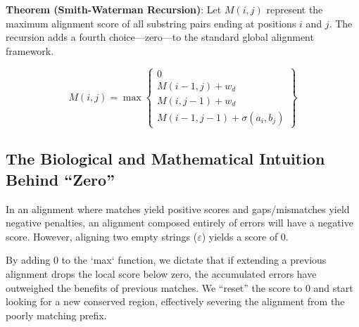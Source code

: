 \begin{important}
    \textbf{Theorem (Smith-Waterman Recursion)}:
    Let $M(i,j)$ represent the maximum alignment score of all substring pairs ending at positions $i$ and $j$. The recursion adds a fourth choice—zero—to the standard global alignment framework.
    
    \begin{equation}
    M(i, j) = \max \left\{ 
        \begin{array}{l} 
        0 \\ 
        M(i-1, j) + w_d \\ 
        M(i, j-1) + w_d \\ 
        M(i-1, j-1) + \sigma(a_i, b_j) 
        \end{array} 
    \right\}
    \label{eq:smithwaterman}
    \end{equation}
\end{important}

\subsection{The Biological and Mathematical Intuition Behind ``Zero''}
In an alignment where matches yield positive scores and gaps/mismatches yield negative penalties, an alignment composed entirely of errors will have a negative score. However, aligning two empty strings ($\varepsilon$) yields a score of $0$. 

By adding $0$ to the `max` function, we dictate that if extending a previous alignment drops the local score below zero, the accumulated errors have outweighed the benefits of previous matches. \sta We ``reset'' the score to $0$ and start looking for a new conserved region, effectively severing the alignment from the poorly matching prefix. 

